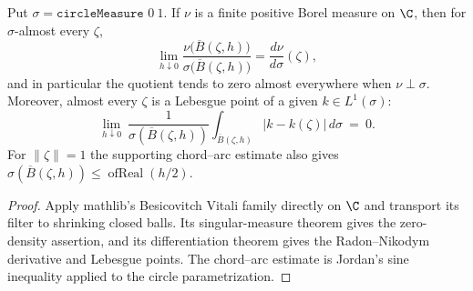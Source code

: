 \begin{theorem}
  \label{thm:circle_differentiation}
  \leanok
  Put $\sigma=\texttt{circleMeasure }0\ 1$. If $\nu$ is a finite positive
  Borel measure on $\C$, then for $\sigma$-almost every $\zeta$,
  \[
    \lim_{h\downarrow0}
      \frac{\nu\bigl(\overline B(\zeta,h)\bigr)}
           {\sigma\bigl(\overline B(\zeta,h)\bigr)}
      =\frac{d\nu}{d\sigma}(\zeta),
  \]
  and in particular the quotient tends to zero almost everywhere when
  $\nu\perp\sigma$. Moreover, almost every $\zeta$ is a Lebesgue point of a
  given $k\in L^1(\sigma)$:
  \[
    \lim_{h\downarrow0}\ \frac{1}{\sigma(\overline B(\zeta,h))}
      \int_{\overline B(\zeta,h)}|k-k(\zeta)|\,d\sigma\ =\ 0.
  \]
  For $\|\zeta\|=1$ the supporting chord--arc estimate also gives
  $\sigma(\overline B(\zeta,h))\le \operatorname{ofReal}(h/2)$.
  \begin{proof}
    \leanok
    Apply mathlib's Besicovitch Vitali family directly on $\C$ and transport
    its filter to shrinking closed balls. Its singular-measure theorem gives
    the zero-density assertion, and its differentiation theorem gives the
    Radon--Nikodym derivative and Lebesgue points. The chord--arc estimate is
    Jordan's sine inequality applied to the circle parametrization.
  \end{proof}
\end{theorem}

